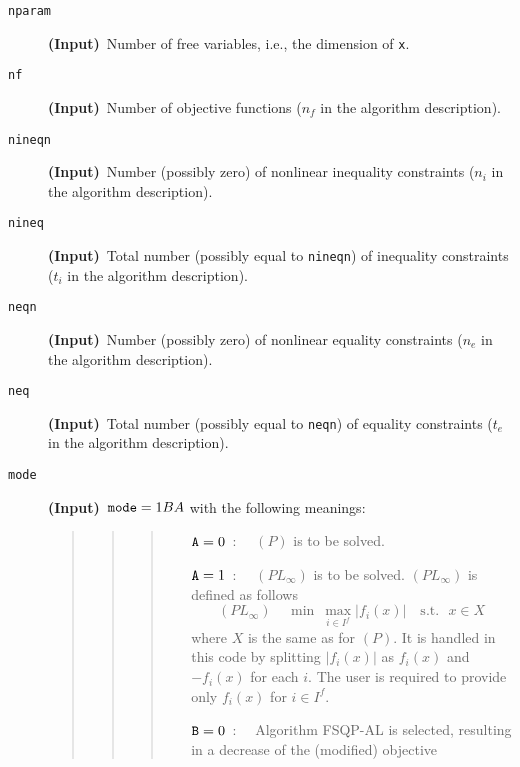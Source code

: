 \vspace{1em}
\begin{description}
\item[\tt nparam] {\bf (Input)}~Number of free variables,
                  i.e., the dimension of {\tt x}.
\item[\tt nf]   {\bf (Input)}~Number of objective 
                   functions ($n_f$ in the algorithm description).
\item[\tt nineqn]    {\bf (Input)}~Number (possibly zero) of 
                       nonlinear inequality constraints ($n_i$ in the
                      algorithm description). 
\item[\tt nineq]  {\bf (Input)}~Total number (possibly equal 
                       to {\tt nineqn}) of 
                       inequality constraints ($t_i$ in the algorithm 
                  description).
\item[\tt neqn]    {\bf (Input)}~Number (possibly zero) of 
                       nonlinear equality constraints ($n_e$ in the
                      algorithm description). 
\item[\tt neq]    {\bf (Input)}~Total number (possibly equal to {\tt neqn}) of 
                  equality constraints ($t_e$ in the algorithm 
                  description).
\item[\tt mode]   {\bf (Input)}~${\tt mode} = 1BA$ with the following 
                  meanings:
                  \begin{quote}
                  \begin{quote}
                  \begin{quote}
                  \begin{itemize}
                  \item[${\tt A} = 0$~:~~] $(P)$ is to be solved.
                  \item[${\tt A} = 1$~:~~] $(PL_\infty)$ is to be solved. 
                  $(PL_\infty)$ is defined as follows
$$
  (PL_\infty)~~~~~ \min ~ \max\limits_{i\in I^f} |f_i(x)| 
                             \mbox{~~~s.t.~~}x\in X
$$
                  where $X$ is the same as for $(P).$ It is handled
                  in this code by splitting $|f_i(x)|$ as $f_i(x)$
                  and $-f_i(x)$ for each $i.$ The user is required
                  to provide only $f_i(x)$ for $i\in I^f$.
                  \item[${\tt B} = 0$~:~~]Algorithm FSQP-AL is 
                                           selected, resulting in a 
                                           decrease of the (modified) objective
 

\end{itemize}
\end{quote}
\end{quote}
\end{quote}
\end{description}
